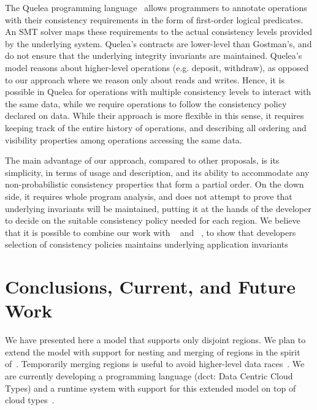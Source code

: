 \documentclass[preprint,numbers]{sigplanconf}
\begin{document}
The Quelea programming language~\cite{sivaramakrishnan2015declarative} allows
programmers to annotate operations with their consistency requirements
in the form of first-order logical predicates.
An SMT solver maps these requirements to the actual
consistency levels provided by the underlying system. Quelea's contracts are
lower-level than Gostman's, and do not ensure that the underlying integrity
invariants are maintained. Quelea's model reasons about higher-level
operations (e.g. deposit, withdraw), as opposed to our approach where we reason 
only about reads and writes. Hence, it is possible in Quelea for operations with
multiple consistency levels to interact with the same data, while we require 
operations to follow the consistency policy declared on data. While their 
approach is more flexible in this sense, it requires keeping track of the entire
history of operations, and describing all ordering and visibility properties among 
operations accessing the same data.




The main advantage of our approach, compared to other proposals, is its simplicity,
in terms of usage and description, and its ability to accommodate any
non-probabilistic consistency properties that form a partial order. On the down side, 
it requires whole program analysis, and does not attempt to prove that underlying 
invariants will be maintained, putting it at the hands of the developer to decide 
on the suitable consistency policy needed for each region. We believe that it is 
possible to combine our work with ~\cite{gotsman2016cause}
and ~\cite{balegas2015putting}, to show that developers selection of consistency
policies maintains underlying application invariants


\section{Conclusions, Current, and Future Work}
\label{sec:conclusion}
We have presented here a model that supports only disjoint regions. We plan to
extend the model with support for nesting and merging of regions in the spirit of~\cite{dolby2012data}.
Temporarily merging regions is useful to avoid higher-level data races~\cite{artho2003high}. We are
currently developing a programming language (dcct: Data Centric Cloud Types)
and a runtime system with 
support for this extended model on top of cloud types~\cite{burckhardt2012cloud}.
\end{document}
